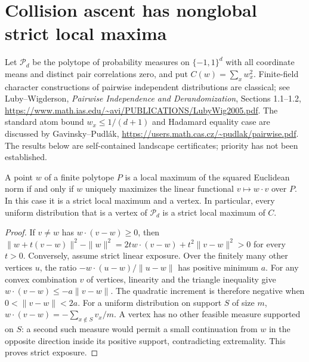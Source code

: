 \section{Collision ascent has nonglobal strict local maxima}
\label{sec:attainment-traps}
Let $\mathcal P_d$ be the polytope of probability measures on
$\{-1,1\}^d$ with all coordinate means and distinct pair correlations
zero, and put $C(w)=\sum_xw_x^2$. Finite-field character constructions
of pairwise independent distributions are classical; see Luby--Wigderson,
\emph{Pairwise Independence and Derandomization}, Sections 1.1--1.2,
\url{https://www.math.ias.edu/~avi/PUBLICATIONS/LubyWig2005.pdf}.
The standard atom bound $w_x\le1/(d+1)$ and Hadamard equality case
are discussed by Gavinsky--Pudl\'ak,
\url{https://users.math.cas.cz/~pudlak/pairwise.pdf}.
The results below are self-contained landscape certificates; priority
has not been established.

\begin{lemma}\label{lem:attainment-criterion}
A point $w$ of a finite polytope $P$ is a local maximum of the squared
Euclidean norm if and only if $w$ uniquely maximizes the linear
functional $v\mapsto w\cdot v$ over $P$. In this case it is a strict
local maximum and a vertex. In particular, every uniform distribution
that is a vertex of $\mathcal P_d$ is a strict local maximum of $C$.
\end{lemma}
\begin{proof}
If $v\ne w$ has $w\cdot(v-w)\ge0$, then
$\|w+t(v-w)\|^2-\|w\|^2=2t w\cdot(v-w)+t^2\|v-w\|^2>0$
for every $t>0$. Conversely, assume strict linear exposure. Over the
finitely many other vertices $u$, the ratio
$-w\cdot(u-w)/\|u-w\|$ has positive minimum $a$. For any convex
combination $v$ of vertices, linearity and the triangle inequality give
$w\cdot(v-w)\le-a\|v-w\|$. The quadratic increment is therefore
negative when $0<\|v-w\|<2a$.
For a uniform distribution on support $S$ of size $m$,
$w\cdot(v-w)=-\sum_{x\notin S}v_x/m$. A vertex has no other feasible
measure supported on $S$: a second such measure would permit a small
continuation from $w$ in the opposite direction inside its positive
support, contradicting extremality. This proves strict exposure.
\end{proof}

